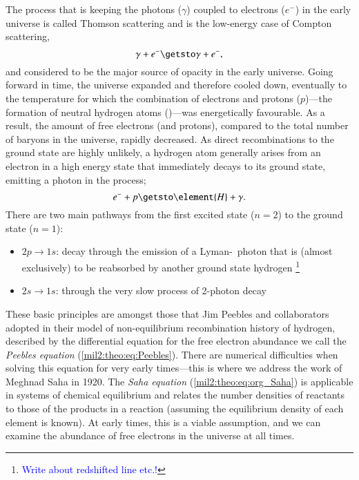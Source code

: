 

The process that is keeping the photons ($\gamma$) coupled to electrons ($e^{-}$) in the early universe is called Thomson scattering and is the low-energy case of Compton scattering,
\begin{equation}\label{mil2:theo:eq:Compton_Thomson}
    \gamma + e^{-} \getsto \gamma + e^{-},
\end{equation}
and considered to be the major source of opacity in the early universe. Going forward in time, the universe expanded and therefore cooled down, eventually to the temperature for which the combination of electrons and protons ($p$)---the formation of neutral hydrogen atoms ()---was energetically favourable. As a result, the amount of free electrons (and protons), compared to the total number of baryons in the universe, rapidly decreased. As direct recombinations to the ground state are highly unlikely, a hydrogen atom generally arises from an electron in a high energy state that immediately decays to its ground state, emitting a photon in the process;
\begin{equation}\label{mil2:theo:eq:relevant_interaction}
    e^{-} + p \getsto \element{H}+\gamma.
\end{equation}
There are two main pathways from the first excited state ($n=2$) to the ground state ($n=1$):
\begin{itemize}
    \item $2p\to 1s$: decay through the emission of a Lyman-\textalpha~photon that is (almost exclusively) to be reabsorbed by another ground state hydrogen \footnote{\textcolor{blue}{Write about redshifted line etc.!}}
    \item $2s\to 1s$: through the very slow process of 2-photon decay
\end{itemize}
These basic principles are amongst those that Jim Peebles and collaborators~\citep[see][]{Peebles1968} adopted in their model of non-equilibrium recombination history of hydrogen, described by the differential equation for the free electron abundance we call the \textit{Peebles equation} (\cref{mil2:theo:eq:Peebles}). There are numerical difficulties when solving this equation for very early times---this is where we address the work of Meghnad Saha in 1920. The \textit{Saha equation} (\cref{mil2:theo:eq:org_Saha}) is applicable in systems of chemical equilibrium and relates the number densities of reactants to those of the products in a reaction (assuming the equilibrium density of each element is known). At early times, this is a viable assumption, and we can examine the abundance of free electrons in the universe at all times.~\citep{Peebles1968,ChungPei1995,Callin2006}

